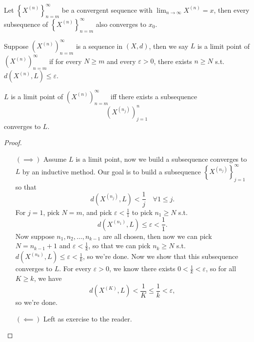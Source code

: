 \begin{lemma}
    Let \(\left\{ X^{(n)} \right\}_{n=m}^{\infty}  \) be a convergent sequence with \(\lim_{n \to \infty} X^{(n)} = x \), then every subsequence of \(\left\{ X^{(n)} \right\}_{n=m}^{\infty}  \) also converges to \(x_0\).    
\end{lemma}

\begin{definition}
    Suppose \(\left( X^{(n)} \right)_{n=m}^{\infty}  \) is a sequence in \((X, d)\), then we say \(L\) is a limit point of \(\left( X^{(n)} \right)_{n=m}^{\infty}  \) if for every \(N \ge m\) and every \(\varepsilon > 0\), there exists \(n \ge N\) s.t. \(d\left( X^{(n)}, L \right) \le \varepsilon  \).        
\end{definition}

\begin{proposition}
    \(L\) is a limit point of \(\left( X^{(n)} \right)_{n=m}^{\infty}  \) iff there exists a subsequence 
    \[
        \left( X^{(n_j)} \right)_{j=1}^n 
    \]  converges to \(L\). 
\end{proposition}
\begin{proof}
    \vphantom{text}
    \begin{itemize}
        \item [\((\implies )\)] Assume \(L\) is a limit point, now we build a subsequence converges to \(L\) by an inductive method. Our goal is to build a subsequence \(\left\{ X^{(n_j)} \right\} _{j=1}^{\infty} \) so that 
        \[
            d\left( X^{(n_j)}, L \right) < \frac{1}{j} \quad \forall 1 \le j.
        \]
        For \(j=1\), pick \(N = m\), and pick \(\varepsilon < \frac{1}{1}\) to pick \(n_1 \ge N\) s.t.
        \[
            d\left( X^{(n_1)}, L \right) \le \varepsilon < \frac{1}{1}. 
        \] Now suppose \(n_1, n_2, \dots , n_{k-1}\) are all chosen, then now we can pick \(N = n_{k-1} + 1\) and \(\varepsilon < \frac{1}{k}\), so that we can pick \(n_k \ge N\) s.t. \(d\left( X^{(n_k)}, L \right) \le \varepsilon < \frac{1}{k}\), so we're done. Now we show that this subsequence converges to \(L\). For every \(\varepsilon > 0\), we know there exists \(0 < \frac{1}{k} < \varepsilon \), so for all \(K \ge k\), we have 
        \[
            d\left( X^{(K)}, L \right) < \frac{1}{K} \le \frac{1}{k} < \varepsilon,
        \] so we're done.
        \item [\((\impliedby)\)] Left as exercise to the reader.
    \end{itemize}
\end{proof}


